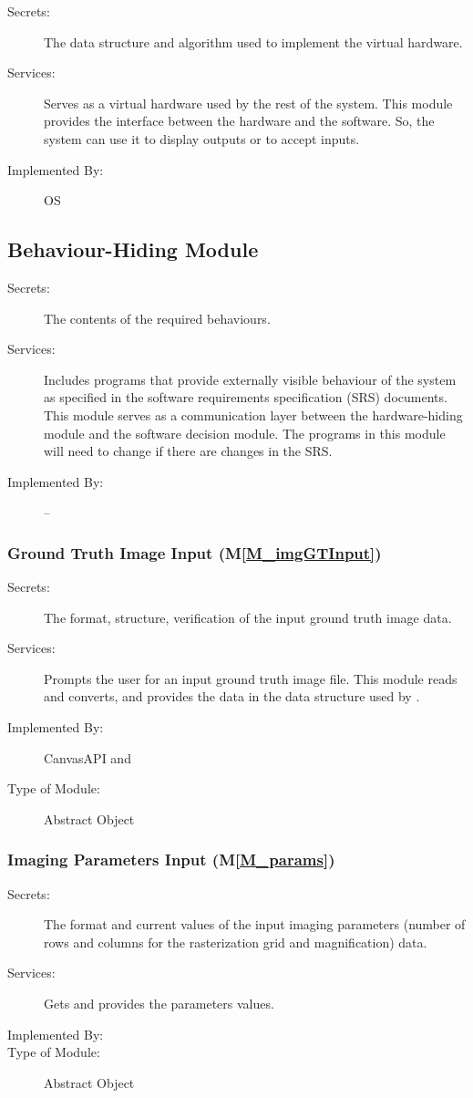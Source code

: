 \documentclass[12pt, titlepage]{article}
\newcommand{\mref}[1]{M\ref{#1}}
\begin{document}
\begin{description}
\item[Secrets:]The data structure and algorithm used to implement the virtual
  hardware.
\item[Services:]Serves as a virtual hardware used by the rest of the
  system. This module provides the interface between the hardware and the
  software. So, the system can use it to display outputs or to accept inputs.
\item[Implemented By:] OS
\end{description}

\subsection{Behaviour-Hiding Module}

\begin{description}
\item[Secrets:]The contents of the required behaviours.
\item[Services:]Includes programs that provide externally visible behaviour of
  the system as specified in the software requirements specification (SRS)
  documents. This module serves as a communication layer between the
  hardware-hiding module and the software decision module. The programs in this
  module will need to change if there are changes in the SRS.
\item[Implemented By:] --
\end{description}


\subsubsection{Ground Truth Image Input (\mref{M_imgGTInput})}
\begin{description}
\item[Secrets:]The format, structure, verification of the input ground truth image data.
\item[Services:]Prompts the user for an input ground truth image file. This module reads and
  converts, and provides the data in the data structure used by \progname{}.
\item[Implemented By:] CanvasAPI and \progname{}
\item[Type of Module:] Abstract Object
\end{description}


\subsubsection{Imaging Parameters Input (\mref{M_params})}
\begin{description}
\item[Secrets:]The format and current values of the input imaging parameters (number
  of rows and columns for the rasterization grid and magnification) data.
\item[Services:]Gets and provides the parameters values.
\item[Implemented By:] \progname{}
\item[Type of Module:] Abstract Object
\end{description}
\end{document}
